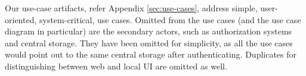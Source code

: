 Our use-case artifacts, refer Appendix \ref{sec:use-cases}, address simple, user-oriented, system-critical, use cases.
Omitted from the use cases (and the use case diagram in particular) are the secondary actors, such as authorization systems and central storage.
They have been omitted for simplicity, as all the use cases would point out to the same central storage after authenticating. Duplicates for distinguishing between web  and local UI are omitted as well.
